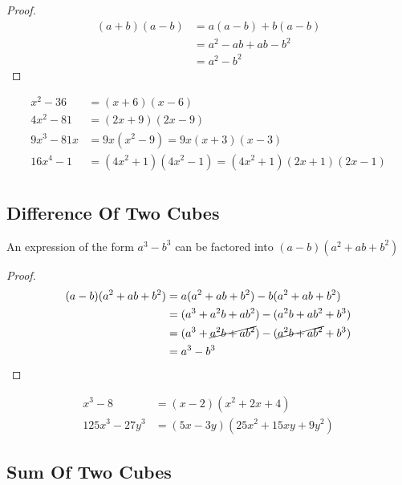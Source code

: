 \documentclass[english,seminar]{lecture}
\begin{document}
\begin{proof}
	\begin{align*}
		  (a + b)(a - b)
		&= a(a - b) + b(a - b) \\
		&= a^2 - ab + ab -b^2  \\
		&= a^2 - b^2
	\end{align*}
\end{proof}

\begin{example}[Factor]
	\begin{align*}
		x^2 - 36 &= (x + 6)(x - 6)\\
		4x^2 - 81 &= (2x + 9)(2x - 9)\\
		9x^3 - 81x &= 9x(x^2 - 9) = 9x(x + 3)(x - 3)\\
		16x^4 - 1 &= (4x^2 + 1)(4x^2 - 1) = (4x^2 + 1)(2x + 1)(2x - 1)\\
	\end{align*}	
\end{example}

\subsection{Difference Of Two Cubes}

\begin{theorem}
	An expression of the form $a^3 - b^3$ can be factored into $(a - b)(a^2 + ab + b^2)$	
\end{theorem}

\begin{proof}
	\begin{align*}
		  (a-b)(a^2 + ab +b^2 )
		&= a(a^2 + ab +b^2 ) - b(a^2 + ab +b^2 ) \\
		&= (a^3 + a^2 b + ab^2) - (a^2b + ab^2 + b^3)  \\
		&= (a^3 + \cancel{a^2 b + ab^2}) - (\cancel{a^2b + ab^2} + b^3)  \\
		&= a^3 - b^3
	\end{align*}
\end{proof}

\begin{example}[Factor]
	\begin{align*}
		x^3 - 8 &= (x - 2)(x^2 + 2x + 4) \\
		125x^3 - 27y^3 &= (5x - 3y)(25x^2 + 15xy + 9y^2)
	\end{align*}	
\end{example}

\subsection{Sum Of Two Cubes}
\end{document}
